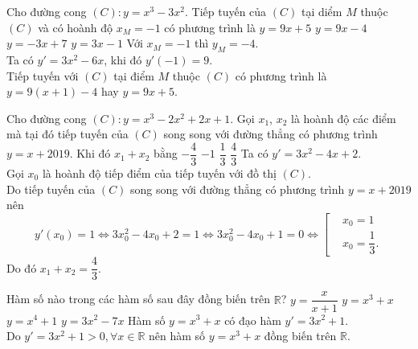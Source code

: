 \begin{ex}%
 Cho đường cong $(C)\colon y=x^3-3x^2$. Tiếp tuyến của $(C)$ tại diểm $M$ thuộc $(C)$ và có hoành độ $x_M=-1$ có phương trình là 
 \choice
  {\True $y=9x+5$}
  {$y=9x-4$}
  {$y=-3x+7$}
  {$y=3x-1$}
 \loigiai
  {
  Với $x_M=-1$ thì $y_M=-4$.\\
  Ta có $y'=3x^2-6x$, khi đó $y'(-1)=9$.\\
  Tiếp tuyến với $(C)$ tại điểm $M$ thuộc $(C)$ có phương trình là
  $y=9(x+1)-4$ hay $y=9x+5$.
  }
\end{ex}

\begin{ex}%
 Cho đường cong $(C)\colon y=x^3-2x^2+2x+1$. Gọi $x_1$, $x_2$ là hoành độ các điểm mà tại đó tiếp tuyến của $(C)$ song song với đường thẳng có phương trình $y=x+2019$. Khi đó $x_1+x_2$ bằng
 \choice
  {$-\dfrac{4}{3}$}
  {$-1$}
  {$\dfrac{1}{3}$}
  {\True $\dfrac{4}{3}$}
 \loigiai
  {
  Ta có $y'=3x^2-4x+2$.\\
  Gọi $x_0$ là hoành độ tiếp điểm của tiếp tuyến với đồ thị $(C)$.\\
  Do tiếp tuyến của $(C)$ song song với đường thẳng có phương trình $y=x+2019$ nên
  \[y'(x_0)=1\Leftrightarrow 3x_0^2-4x_0+2=1 \Leftrightarrow 3x_0^2-4x_0+1=0 \Leftrightarrow \left[\begin{aligned}&x_0=1 \\&x_0=\dfrac{1}{3}.\end{aligned}\right.\]
  Do đó $x_1+x_2=\dfrac{4}{3}$.
  }
\end{ex}

\begin{ex}%
 Hàm số nào trong các hàm số sau đây đồng biến trên $\mathbb{R}$?
 \choice
  {$y=\dfrac{x}{x+1}$}
  {\True $y=x^3+x$}
  {$y=x^4+1$}
  {$y=3x^2-7x$}
 \loigiai
  {
  Hàm số $y=x^3+x$ có đạo hàm $y'=3x^2+1$.\\
  Do $y'=3x^2+1>0, \forall x \in \mathbb{R}$ nên hàm số $y=x^3+x$ đồng biến trên $\mathbb{R}$.
  }
\end{ex}

